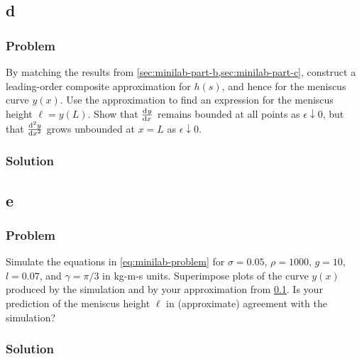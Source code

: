 \documentclass[12pt,twoside]{article}
\begin{document}
\subsection{d}
\label{sec:minilab-part-d}
\subsubsection*{Problem}
By matching the results from \cref{sec:minilab-part-b,sec:minilab-part-c},
construct a leading-order composite approximation for $h(s)$, and hence for the
meniscus curve $y(x)$. Use the approximation to find an expression for the
meniscus height $\ell=y(L)$. Show that $\od{y}{x}$ remains bounded at all
points as $\epsilon\downarrow0$, but that $\od[2]{y}{x}$ grows unbounded at
$x=L$ as $\epsilon\downarrow0$.
\subsubsection*{Solution}
\todo{}

\subsection{e}
\subsubsection*{Problem}
Simulate the equations in \cref{eq:minilab-problem} for $\sigma=0.05$,
$\rho=1000$, $g=10$, $l=0.07$, and $\gamma=\pi/3$ in kg-m-s units. Superimpose
plots of the curve $y(x)$ produced by the simulation and by your approximation
from \cref{sec:minilab-part-d}. Is your prediction of the meniscus height $\ell$
in (approximate) agreement with the simulation?
\subsubsection*{Solution}
\todo{}
\end{document}
